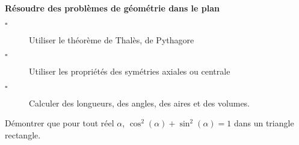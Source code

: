 \begin{titre}

\end{titre}


\begin{CpsCol}
\textbf{Résoudre des problèmes de géométrie dans le plan}
\begin{description}
\item[$\square$] Utiliser le théorème de Thalès, de Pythagore
\item[$\square$] Utiliser les propriétés des symétries axiales ou centrale
\item[$\square$] Calculer des longueurs, des angles, des aires et des volumes.
\end{description}
\end{CpsCol}



\begin{minipage}{0.47\linewidth}




\end{minipage}
\hfill
\begin{minipage}{0.47\linewidth}





\end{minipage}


\begin{minipage}[t]{0.47\linewidth}

\end{minipage}
\hfill
\begin{minipage}[t]{0.47\linewidth}


\begin{ROC}

Démontrer que pour tout réel $\alpha$, $\cos^2(\alpha) + \sin^2(\alpha) = 1$ dans un triangle rectangle.
\end{ROC}

\end{minipage}


